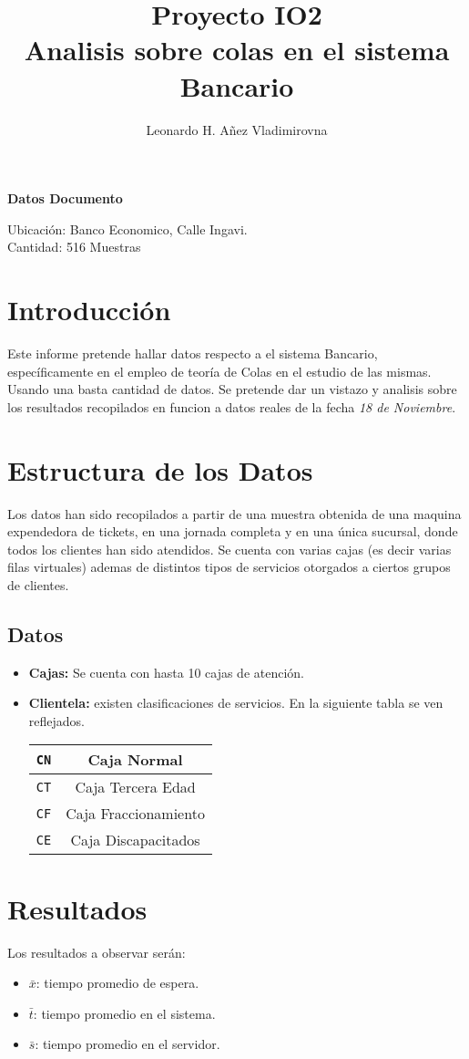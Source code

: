 \documentclass[10pt,letterpaper]{report}
\author{Leonardo H. Añez Vladimirovna}
\title{Proyecto IO2\\Analisis sobre colas en el sistema Bancario}
\begin{document}
\maketitle
\textbf{Datos Documento}
\begin{fminipage}{\textwidth}
Ubicación: Banco Economico, Calle Ingavi.\\
Cantidad: 516 Muestras
\end{fminipage}

\section*{Introducción}
Este informe pretende hallar datos respecto a el sistema Bancario, específicamente en el empleo de teoría de Colas en el estudio de las mismas. Usando una basta cantidad de datos. Se pretende dar un vistazo y analisis sobre los resultados recopilados en funcion a datos reales de la fecha \textit{18 de Noviembre}.
\section*{Estructura de los Datos}
Los datos han sido recopilados a partir de una muestra obtenida de una maquina expendedora de tickets, en una jornada completa y en una única sucursal, donde todos los clientes han sido atendidos. Se cuenta con varias cajas (es decir varias filas virtuales) ademas de distintos tipos de servicios otorgados a ciertos grupos de clientes.
\subsection*{Datos}
\begin{itemize}
\item \textbf{Cajas:} Se cuenta con hasta 10 cajas de atención.
\item \textbf{Clientela:} existen clasificaciones de servicios. En la siguiente tabla se ven reflejados.
\begin{center}
\begin{tabular}{|c|c|}
\hline 
\texttt{CN} & Caja Normal \\ 
\hline 
\texttt{CT} & Caja Tercera Edad \\ 
\hline 
\texttt{CF} & Caja Fraccionamiento \\ 
\hline 
\texttt{CE} & Caja Discapacitados \\ 
\hline 
\end{tabular} 
\end{center}
\end{itemize}
\section*{Resultados}
Los resultados a observar serán:
\begin{itemize}
\item $\bar{x}$: tiempo promedio de espera. 
\item $\bar{t}$: tiempo promedio en el sistema. 
\item $\bar{s}$: tiempo promedio en el servidor. 
\end{itemize}
\end{document}
